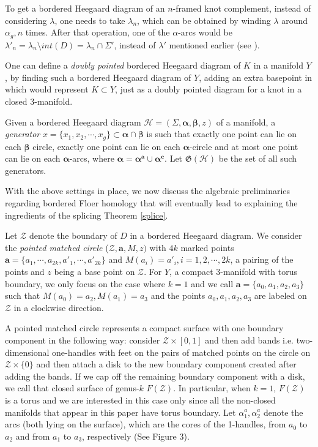 \documentclass[11pt,reqno]{amsart}
\theoremstyle{definition}
\newtheorem *{remark}{Remark}
\begin{document}
To get a bordered Heegaard diagram of an $n$-framed knot complement, instead of considering $\lambda$, one needs to take $\lambda_n$, which can be obtained by winding $\lambda$ around $\alpha_g, n$ times. After that operation, one of the $\alpha$-arcs would be $ \lambda'_n = \lambda_n \setminus int(D) =  \lambda_n \cap \Sigma'$, instead of $\lambda'$ mentioned earlier (see \cite[Section 2.6]{lee18}).

One can define a \textit{doubly pointed} bordered Heegaard diagram of $K$ in a manifold $Y$, by finding such a bordered Heegaard diagram of $Y$, adding an extra basepoint in which would represent $K \subset Y$, just as a doubly pointed diagram for a knot in a closed 3-manifold. 

Given a bordered Heegaard diagram $\mathcal{H} = (\Sigma, \bm{\alpha},\bm{\beta},z) $ of a manifold, a \emph{generator} $x = \{x_1,x_2,\cdots,x_g\} \subset \bm{\alpha} \cap \bm{\beta} $ is such that exactly one point can lie on each $\bm{\beta}$ circle, exactly one point can lie on each $\bm{\alpha}$-circle and at most one point can lie on each $\bm{\alpha}$-arcs, where $\bm{\alpha} = \bm{\alpha^a} \cup \bm{\alpha^c}$. Let $\mathfrak{G}(\mathcal{H})$ be the set of all such generators.

\vspace{.3in}

\noindent With the above settings in place, we now discuss the algebraic preliminaries regarding bordered Floer homology that will eventually lead to explaining the ingredients of the splicing Theorem \ref{splice}.

Let $\mathcal{Z}$ denote the boundary of $D$ in a bordered Heegaard diagram. We consider the \textit{pointed matched circle} ($\mathcal{Z},\textbf{a},M, z)$  with $4k$ marked points 
$\textbf{a} = \{a_1, \cdots, a_{2k}, a'_1,\cdots,a'_{2k}\}$
and $M(a_i) = a'_i, i = 1,2,\cdots,2k $, a pairing of the points and $z$ being a base point on $\mathcal{Z}$. For $Y$, a compact 3-manifold with torus boundary, we only focus on the case where $k=1$ and we call $\textbf{a} = \{a_0,a_1,a_2,a_3\}$ such that $M(a_0) = a_2,M(a_1) = a_3$ and the points $a_0,a_1,a_2,a_3$ are labeled on $\mathcal{Z}$ in a clockwise direction.

A pointed matched circle represents a compact surface with one boundary component in the following way: consider $\mathcal{Z} \times [0,1] $ and then add bands i.e. two-dimensional one-handles with feet on the pairs of matched points on the circle on $\mathcal{Z} \times \{0\}$ and then attach a disk to the new boundary component created after adding the bands. If we cap off the remaining boundary component with a disk, we call that closed surface of genus-$k$ $F(\mathcal{Z})$. In particular, when $k=1$, $F(\mathcal{Z})$ is a torus and we are interested in this case only since all the non-closed manifolds that appear in this paper have torus boundary. Let $\alpha_1^a, \alpha_2^a$ denote the arcs (both lying on the surface), which are the cores of the 1-handles, from $a_0$ to $a_2$ and from $a_1$ to $a_3$, respectively (See Figure 3). 
\end{document}
